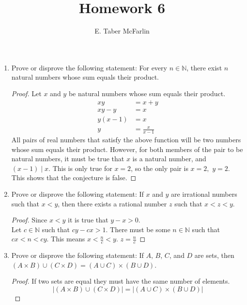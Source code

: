 \documentclass[12pt,a4paper,reqno,parskip=full]{amsart}
\numberwithin{equation}{section}
\theoremstyle{plain}
\theoremstyle{definition}
\begin{document}
\title{Homework 6}

\author{E. Taber McFarlin}

\maketitle

\begin{enumerate}
  \item Prove or disprove the following statement: For every $n\in\mathbb{N}$, there exist $n$ natural numbers whose sum equals their product.
        \begin{proof}
          Let $x$ and $y$ be natural numbers whose sum equals their product.
          \begin{align*}
            xy       & = x + y           \\
            xy - y   & = x               \\
            y(x - 1) & = x               \\
            y        & = \frac{x}{x - 1}
          \end{align*}
          All pairs of real numbers that satisfy the above function will be two numbers whose sum equals their product. However, for both members of the pair to be natural numbers, it must be true that $x$ is a natural number, and $(x - 1 )\mid x$. This is only true for $x=2$, so the only pair is $x=2,$ $y = 2$. This shows that the conjecture is false.
        \end{proof}
  \item Prove or disprove the following statement: If $x$ and $y$ are irrational numbers such that $x < y$, then there exists a rational number $z$ such that $x<z<y$.
        \begin{proof} Since $x < y$ it is true that $y - x > 0$. \\
          Let $c\in\mathbb{N}$ such that $cy - cx > 1$. There must be some $n\in\mathbb{N}$ such that $cx<n<cy$. This means $\displaystyle x<\frac{n}{c}<y$. $\displaystyle z=\frac{n}{c}$
        \end{proof}
  \item Prove or disprove the following statement: If $A$, $B$, $C$, and $D$ are sets, then $(A\times B)\cup(C\times D)=(A\cup C)\times(B\cup D)$.
        \begin{proof}
          If two sets are equal they must have the same number of elements.
          \[|(A\times B)\cup(C\times D)| = |(A\cup C)\times(B\cup D)|\]


\end{proof}
\end{enumerate}
\end{document}
